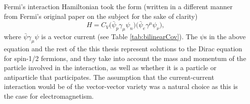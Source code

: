 Fermi's interaction Hamiltonian took the form (written in a different manner from Fermi's original
paper on the subject for the sake of clarity) 
%
\begin{equation}
  H = C_V\big( \bar{\psi}_p \gamma_\mu \psi_n \big) \big( \bar{\psi}_e \gamma^\mu \psi_\nu \big), 
\end{equation}
%
where $\bar{\psi} \gamma_\mu \psi$ is a vector current (see Table \ref{tab:bilinearCov}).
The $\psi$s in the above equation and the rest of the this thesis represent solutions to
the Dirac equation for spin-1/2 fermions, and they take into account the mass and momentum
of the particle involved in the interaction, as well as whether it is a particle or antiparticle
that participates.
The assumption
that the current-current interaction would be of the vector-vector variety was a natural
choice as this is the case for electromagnetism.

